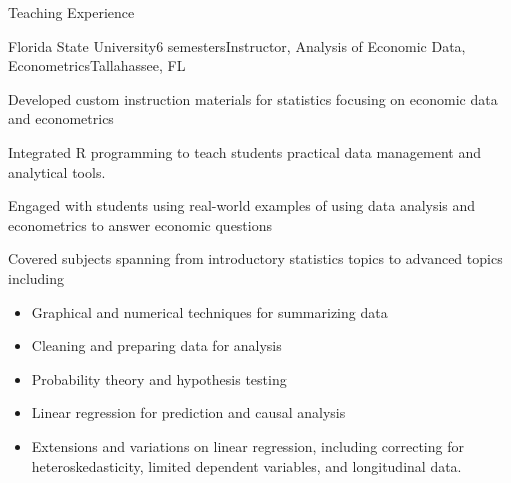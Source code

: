 \documentclass{resume} %
\begin{document}
\begin{rSection}{Teaching Experience}
    \begin{rSubsection}{Florida State University}{6 semesters}{Instructor, Analysis of Economic Data, Econometrics}{Tallahassee, FL}
        \item Developed custom instruction materials for statistics focusing on economic data and econometrics
        \item Integrated R programming to teach students practical data management and analytical tools.
        \item Engaged with students using real-world examples of using data analysis and econometrics to answer economic questions
        \item Covered subjects spanning from introductory statistics topics to advanced topics including
        \newpage
        \begin{itemize}
            \item Graphical and numerical techniques for summarizing data
            \item Cleaning and preparing data for analysis
            \item Probability theory and hypothesis testing
            \item Linear regression for prediction and causal analysis
            \item Extensions and variations on linear regression, including correcting for heteroskedasticity, limited dependent variables, and longitudinal data.
        \end{itemize}
    \end{rSubsection}
\end{rSection}
\end{document}
